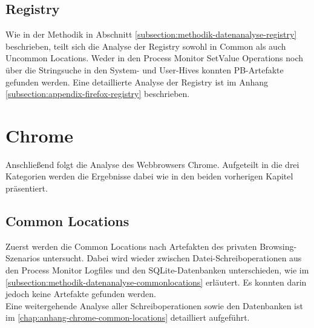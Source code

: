 \subsection*{Registry}
Wie in der Methodik in Abschnitt \ref{subsection:methodik-datenanalyse-registry} beschrieben, teilt sich die Analyse der Registry sowohl in Common als auch Uncommon Locations. Weder in den Process Monitor \glqq{}SetValue\grqq{} Operations noch über die Stringsuche in den System- und User-Hives konnten PB-Artefakte gefunden werden. Eine detaillierte Analyse der Registry ist im Anhang \ref{subsection:appendix-firefox-registry} beschrieben. 

\pagebreak

\section{Chrome}\label{chap:ergebnisse-chrome}

Anschließend folgt die Analyse des Webbrowsers Chrome. Aufgeteilt in die drei Kategorien werden die Ergebnisse dabei wie in den beiden vorherigen Kapitel präsentiert.

\subsection*{Common Locations}\label{chap:ergebnisse-chrome-common-location}

Zuerst werden die Common Locations nach Artefakten des privaten Browsing-Szenarios untersucht. Dabei wird wieder zwischen Datei-Schreiboperationen aus den Process Monitor Logfiles und den SQLite-Datenbanken unterschieden, wie im \autoref{subsection:methodik-datenanalyse-commonlocations} erläutert. Es konnten darin jedoch keine Artefakte gefunden werden.\\
Eine weitergehende Analyse aller Schreiboperationen sowie den Datenbanken ist im \autoref{chap:anhang-chrome-common-locations} detailliert aufgeführt.

